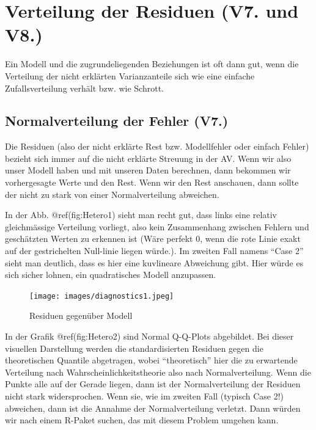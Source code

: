 \documentclass[
  10pt,
  letterpaper,
  a4paper, twoside]{scrreprt}
\begin{document}
\section{Verteilung der Residuen (V7. und
V8.)}\label{verteilung-der-residuen-v7.-und-v8.}

Ein Modell und die zugrundeliegenden Beziehungen ist oft dann gut, wenn
die Verteilung der nicht erklärten Varianzanteile sich wie eine einfache
Zufallsverteilung verhält bzw. wie Schrott.

\subsection{Normalverteilung der Fehler
(V7.)}\label{normalverteilung-der-fehler-v7.}

Die Residuen (also der nicht erklärte Rest bzw. Modellfehler oder
einfach Fehler) bezieht sich immer auf die nicht erklärte Streuung in
der AV. Wenn wir also unser Modell haben und mit unseren Daten
berechnen, dann bekommen wir vorhergesagte Werte und den Rest. Wenn wir
den Rest anschauen, dann sollte der nicht zu stark von einer
Normalverteilung abweichen.

In der Abb. @ref(fig:Hetero1) sieht man recht gut, dass links eine
relativ gleichmässige Verteilung vorliegt, also kein Zusammenhang
zwischen Fehlern und geschätzten Werten zu erkennen ist (Wäre perfekt 0,
wenn die rote Linie exakt auf der gestrichelten Null-linie liegen
würde.). Im zweiten Fall namens \enquote{Case 2} sieht man deutlich,
dass es hier eine kuvlineare Abweichung gibt. Hier würde es sich sicher
lohnen, ein quadratisches Modell anzupassen.

\begin{figure}[H]

{\centering \texttt{[image: images/diagnostics1.jpeg]}

}

\caption{Residuen gegenüber Modell}

\end{figure}%

In der Grafik @ref(fig:Hetero2) sind Normal Q-Q-Plots abgebildet. Bei
dieser visuellen Darstellung werden die standardisierten Residuen gegen
die theoretischen Quantile abgetragen, wobei \enquote{theoretisch} hier
die zu erwartende Verteilung nach Wahrscheinlichkeitstheorie also nach
Normalverteilung. Wenn die Punkte alle auf der Gerade liegen, dann ist
der Normalverteilung der Residuen nicht stark widersprochen. Wenn sie,
wie im zweiten Fall (typisch Case 2!) abweichen, dann ist die Annahme
der Normalverteilung verletzt. Dann würden wir nach einem R-Paket
suchen, das mit diesem Problem umgehen kann.
\end{document}
